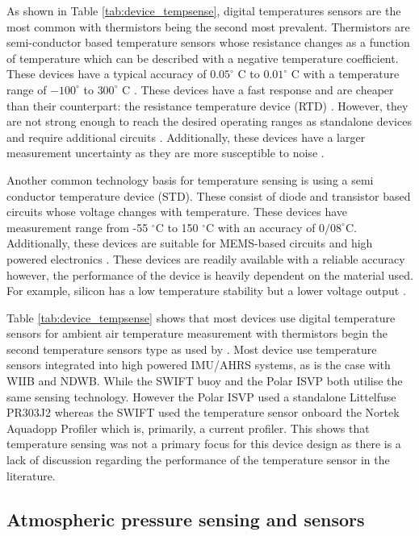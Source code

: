 As shown in Table \ref{tab:device_tempsense}, digital temperatures sensors are the most common with thermistors being the second most prevalent. Thermistors are semi-conductor based temperature sensors whose resistance changes as a function of temperature which can be described with a negative temperature coefficient. These devices have a typical accuracy of $0.05^\circ$ C to $0.01^\circ$ C with a temperature range of  $-100^\circ $ to $ 300^\circ$ C \cite{childs2000review}. These devices have a fast response and are cheaper than their counterpart: the resistance temperature device (RTD) \cite{childs2000review}. However, they are not strong enough to reach the desired operating ranges as standalone devices and require additional circuits \cite{tong2001improving}. Additionally, these devices have a larger measurement uncertainty as they are more susceptible to noise \cite{childs2000review}.\par 

Another common technology basis for temperature sensing is using a semi conductor temperature device (STD). These consist of diode and transistor based circuits whose voltage changes with temperature. These devices have measurement range from -55 $^\circ$C  to 150 $^\circ $C with an accuracy of $0/08 ^\circ $C. Additionally, these devices are suitable for MEMS-based circuits and high powered electronics \cite{willander2006silicon}. These devices are readily available with a reliable accuracy however, the performance of the device is heavily dependent on the material used. For example, silicon has a low temperature stability but a lower voltage output \cite{childs2000review}.

Table \ref{tab:device_tempsense} shows that most devices use digital temperature sensors for ambient air temperature measurement with thermistors begin the second temperature sensors type as used by \textcite{thomson2012wave}. Most device use temperature sensors integrated into high powered IMU/AHRS systems, as is the case with WIIB and NDWB. While the SWIFT buoy and the Polar ISVP both utilise the same sensing technology. However the Polar ISVP used a standalone Littelfuse PR303J2 whereas the SWIFT used the temperature sensor onboard the Nortek Aquadopp Profiler which is, primarily, a current profiler. This shows that temperature sensing was not a primary focus for this device design as there is a lack of discussion regarding the performance of the temperature sensor in the literature.


\subsection{Atmospheric pressure sensing and sensors}

